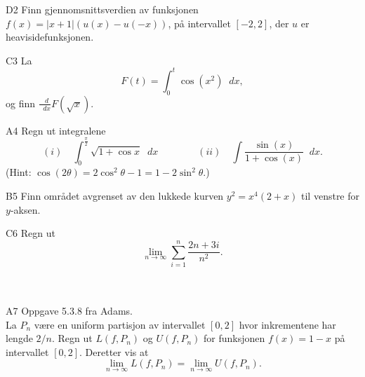 \documentclass[a4paper,norsk,11pt]{interaktiv}
\newcommand{\dee}{\mathop{}\!{d}}
\begin{document}
\begin{oppgave}{D2}
  Finn gjennomsnittsverdien av funksjonen $f(x) = |x+1| (u(x)-u(-x))$,  
  på intervallet $[-2,2]$, der  $u$ er heavisidefunksjonen.
  
%  
\end{oppgave} 

\begin{oppgave}{C3}
  La
  \begin{equation*}
    F(t) = \int_0^t \cos(x^2) \dee x,
  \end{equation*}
  og finn $\frac{\dee}{\dee x} F(\sqrt{x})$.
\end{oppgave}

\begin{oppgave}{A4}
  Regn ut integralene
  \begin{equation*}
    (i) \quad \int_0^{\frac{\pi}{2}} \sqrt{1 + \cos x} \dee x \qquad
    \qquad (ii) \quad \int\frac{\sin\left( x \right)}{1+\cos\left( x
      \right)} \dee x.
  \end{equation*}
  (Hint: $\cos(2\theta) = 2\cos^2 \theta -1 = 1 - 2 \sin^2 \theta$.)
\end{oppgave}

\begin{oppgave}{B5}
  Finn området avgrenset av den lukkede kurven
  $y^{2}=x^{4}\left( 2+x \right)$ til venstre for $y$-aksen.
\end{oppgave}


\begin{oppgave}{C6}
  Regn ut 
  \begin{equation*}
    \lim_{n\to \infty} \sum_{i=1}^n \frac{2n+3i}{n^2}.
  \end{equation*}
  \\[-6pt]\\[-6pt]
\end{oppgave}

\begin{oppgave}{A7}
  Oppgave 5.3.8 fra Adams.\\
  La $P_n$ være en uniform partisjon av intervallet
  $\left[ 0,2 \right]$ hvor inkrementene har lengde $2/n.$ Regn ut
  $L\left( f,P_n \right)$ og $U\left( f,P_n \right)$ for funksjonen
  $f\left( x \right)=1-x$ på intervallet $\left[ 0,2 \right].$
  Deretter vis at
  \begin{equation*}
    \lim_{n\to \infty}L\left( f,P_n
    \right)=\lim_{n\to \infty}U\left( f,P_n \right).
  \end{equation*}
  \\[-6pt]
\end{oppgave}
\end{document}
